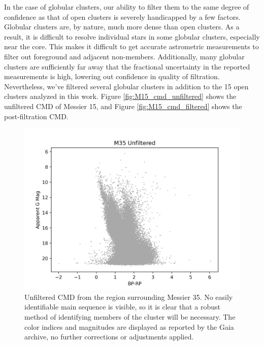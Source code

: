 \documentclass[onecolumn,table,xcdraw,super]{aastex631}
\begin{document}
In the case of globular clusters, our ability to filter them to the same degree of confidence as that of open clusters is severely handicapped by a few factors. Globular clusters are, by nature, much more dense than open clusters. As a result, it is difficult to resolve individual stars in some globular clusters, especially near the core. This makes it difficult to get accurate astrometric measurements to filter out foreground and adjacent non-members. Additionally, many globular clusters are sufficiently far away that the fractional uncertainty in the reported measurements is high, lowering out confidence in quality of filtration. Nevertheless, we've filtered several globular clusters in addition to the 15 open clusters analyzed in this work.  Figure \ref{fig:M15_cmd_unfiltered} shows the unfiltered CMD of Messier 15, and Figure \ref{fig:M15_cmd_filtered} shows the post-filtration CMD.

\begin{figure}[]
    \centering
      \includegraphics[width=4.75in]{figures/M35_cmd_unfiltered.png}
    \caption{Unfiltered CMD from the region surrounding Messier 35. No easily identifiable main sequence is visible, so it is clear that a robust method of identifying members of the cluster will be necessary. The color indices and magnitudes are displayed as reported by the Gaia archive, no further corrections or adjustments applied.}
    \label{fig:M35_cmd_unfiltered}
\end{figure}
\end{document}
